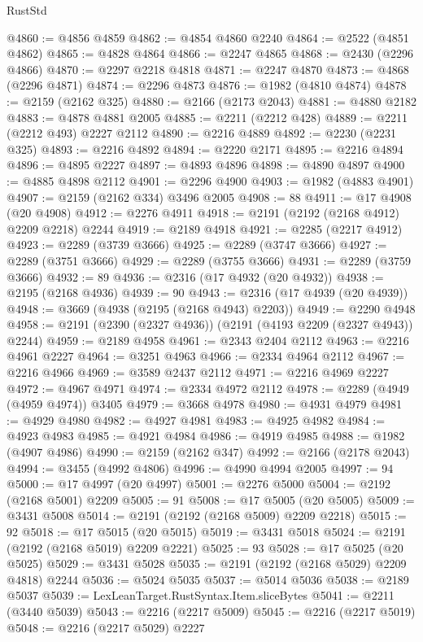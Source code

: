 \begin{lexlean}{RustStd}
\begin{coremodule}
@4860 := @4856 @4859
@4862 := @4854 @4860 @2240
@4864 := @2522 (@4851 @4862)
@4865 := @4828 @4864
@4866 := @2247 @4865
@4868 := @2430 (@2296 @4866)
@4870 := @2297 @2218 @4818
@4871 := @2247 @4870
@4873 := @4868 (@2296 @4871)
@4874 := @2296 @4873
@4876 := @1982 (@4810 @4874)
@4878 := @2159 (@2162 @325)
@4880 := @2166 (@2173 @2043)
@4881 := @4880 @2182
@4883 := @4878 @4881 @2005
@4885 := @2211 (@2212 @428)
@4889 := @2211 (@2212 @493) @2227 @2112
@4890 := @2216 @4889
@4892 := @2230 (@2231 @325)
@4893 := @2216 @4892
@4894 := @2220 @2171
@4895 := @2216 @4894
@4896 := @4895 @2227
@4897 := @4893 @4896
@4898 := @4890 @4897
@4900 := @4885 @4898 @2112
@4901 := @2296 @4900
@4903 := @1982 (@4883 @4901)
@4907 := @2159 (@2162 @334) @3496 @2005
@4908 := 88
@4911 := @17 @4908 (@20 @4908)
@4912 := @2276 @4911
@4918 := @2191 (@2192 (@2168 @4912) @2209 @2218) @2244
@4919 := @2189 @4918
@4921 := @2285 (@2217 @4912)
@4923 := @2289 (@3739 @3666)
@4925 := @2289 (@3747 @3666)
@4927 := @2289 (@3751 @3666)
@4929 := @2289 (@3755 @3666)
@4931 := @2289 (@3759 @3666)
@4932 := 89
@4936 := @2316 (@17 @4932 (@20 @4932))
@4938 := @2195 (@2168 @4936)
@4939 := 90
@4943 := @2316 (@17 @4939 (@20 @4939))
@4948 := @3669 (@4938 (@2195 (@2168 @4943) @2203))
@4949 := @2290 @4948
@4958 := @2191 (@2390 (@2327 @4936)) (@2191 (@4193 @2209 (@2327 @4943)) @2244)
@4959 := @2189 @4958
@4961 := @2343 @2404 @2112
@4963 := @2216 @4961 @2227
@4964 := @3251 @4963
@4966 := @2334 @4964 @2112
@4967 := @2216 @4966
@4969 := @3589 @2437 @2112
@4971 := @2216 @4969 @2227
@4972 := @4967 @4971
@4974 := @2334 @4972 @2112
@4978 := @2289 (@4949 (@4959 @4974)) @3405
@4979 := @3668 @4978
@4980 := @4931 @4979
@4981 := @4929 @4980
@4982 := @4927 @4981
@4983 := @4925 @4982
@4984 := @4923 @4983
@4985 := @4921 @4984
@4986 := @4919 @4985
@4988 := @1982 (@4907 @4986)
@4990 := @2159 (@2162 @347)
@4992 := @2166 (@2178 @2043)
@4994 := @3455 (@4992 @4806)
@4996 := @4990 @4994 @2005
@4997 := 94
@5000 := @17 @4997 (@20 @4997)
@5001 := @2276 @5000
@5004 := @2192 (@2168 @5001) @2209
@5005 := 91
@5008 := @17 @5005 (@20 @5005)
@5009 := @3431 @5008
@5014 := @2191 (@2192 (@2168 @5009) @2209 @2218)
@5015 := 92
@5018 := @17 @5015 (@20 @5015)
@5019 := @3431 @5018
@5024 := @2191 (@2192 (@2168 @5019) @2209 @2221)
@5025 := 93
@5028 := @17 @5025 (@20 @5025)
@5029 := @3431 @5028
@5035 := @2191 (@2192 (@2168 @5029) @2209 @4818) @2244
@5036 := @5024 @5035
@5037 := @5014 @5036
@5038 := @2189 @5037
@5039 := LexLeanTarget.RustSyntax.Item.sliceBytes
@5041 := @2211 (@3440 @5039)
@5043 := @2216 (@2217 @5009)
@5045 := @2216 (@2217 @5019)
@5048 := @2216 (@2217 @5029) @2227

\end{coremodule}
\end{lexlean}
